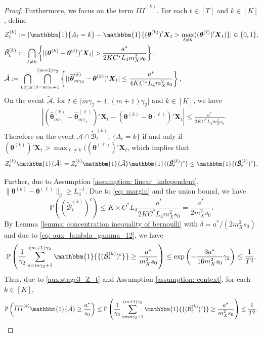 \documentclass[aos,preprint]{imsart}
\theoremstyle{plain}
\theoremstyle{definition}
\newcommand{\btheta}{\boldsymbol{\theta}}
\newcommand{\hbtheta}{\widehat{\boldsymbol{\theta}}}
\newcommand{\idf}{\mathbbm{1}}
\newcommand{\bX}{\boldsymbol{X}}
\newcommand{\tbtheta}{\widetilde{\boldsymbol{\theta}}}
\newcommand{\cA}{\mathcal{A}}
\newcommand{\Pro}{\mathbb{P}}
\begin{document}
\begin{appendix}
\begin{proof}
Furthermore, we focus on the term $\overline{III}^{(k)}$. For each $t \in [T]$ and  $k\in[K]$, define
\begin{align*}
    &Z_t^{(k)}:=|\idf\{A_t=k\}-\idf\{(\btheta^{(k)})'\bX_t>\max_{\ell \neq k}((\btheta^{(\ell)})'\bX_t)\}|\in \{0,1\},\\
     & \tilde{\mathcal{B}}_t^{(k)} := \bigcap_{\ell \neq k}\left\{|(\btheta^{(k)}-\btheta^{(\ell)})'\bX_t| > \frac{a^*}{ 2KC^*L_4 m_X^2 s_0}\right\},\\
&     \tilde{\mathcal{A}} := \bigcap_{k\in [K]} \bigcap_{t = m\gamma_2 + 1}^{(m+1)\gamma_2}\left\{|(\tbtheta_{m\gamma_2}^{(k)}-\btheta^{(k)})'\bX_t| \le \frac{a^*}{ 4KC^*L_4 m_X^2 s_0}\right\},
\end{align*}
On the event $\tilde{\mathcal{A}}$, for $t \in (m\gamma_2+1,(m+1)\gamma_2]$ and $k \in [K]$, we have 
\begin{align*}
&|(\hbtheta_{m\gamma_1}^{(k)}-\hbtheta_{m\gamma_1}^{(\ell)})'\bX_t-(\btheta^{(k)}-\btheta^{(\ell)})'\bX_t|
 \le  \frac{a^*}{ 2KC^*L_4 m_X^2 s_0}.
\end{align*}
Therefore on the event $\tilde{\mathcal{A}}\cap \tilde{\mathcal{B}}_t^{(k)}$, $\{A_t = k\}$ if and only if
$(\btheta^{(k)})'\bX_t>\max_{\ell \neq k}((\btheta^{(\ell)})'\bX_t$, which implies that
\begin{equation}\label{aux:stage3_Z_t}
    Z_t^{(k)} \idf\{\tilde{\cA}\} = Z_t^{(k)} \idf\{\tilde{\cA}\} \idf\{(\tilde{\mathcal{B}}_t^{(k)})^c\} \leq \idf\{(\tilde{\mathcal{B}}_t^{(k)})^c\}.
\end{equation}
 

Further, due to Assumption \ref{assumption: linear_independent}, $\|\btheta^{(k)}-\btheta^{(\ell)}\|_2 \geq L_4^{-1}$. 
Due to \eqref{eq: margin} and the union bound, we have
\begin{equation*}  
\Pro((\tilde{\mathcal{B}}_t^{(k)})^c)\le K \times C^* L_4  \frac{a^*}{ 2KC^*L_4 m_X^2 s_0} = \frac{a^*}{2m_X^2 s_0}.
 \end{equation*}
 By Lemma \ref{lemma: concentration inequality of bernoulli} with $\delta = a^*/(2m_X^2s_0)$ and due to \eqref{eq: aux_lambda_gamma_12}, we have
\begin{equation*}
\Pro\left( \frac{1}{\gamma_2}\sum_{s=m \gamma_2+1}^{(m+1)\gamma_2} \idf{\{(\tilde{\mathcal{B}}_t^{(k)})^c\}}\ge \frac{a^*}{m_X^2 s_0}   \right)\leq \exp\left(- \frac{3a^*}{16m_X^2s_0} \gamma_2\right) \leq \frac{1}{T^2}.
\end{equation*}
Thus, due to \eqref{aux:stage3_Z_t} and Assumption \ref{assumption: context}, for each $k \in [K]$,
\begin{equation}\label{aux:stage3_III}
    \Pro\left( \overline{III}^{(k)} \idf\{\tilde{\cA}\} \ge \frac{a^*}{ s_0} \right) \leq \Pro\left( \frac{1}{\gamma_2}\sum_{s=m \gamma_2+1}^{(m+1)\gamma_2} \idf{\{(\tilde{\mathcal{B}}_t^{(k)})^c\}}\ge \frac{a^*}{m_X^2 s_0}   \right)\leq   \frac{1}{T^2}. 
\end{equation}
 



\end{proof}
\end{appendix}
\end{document}
